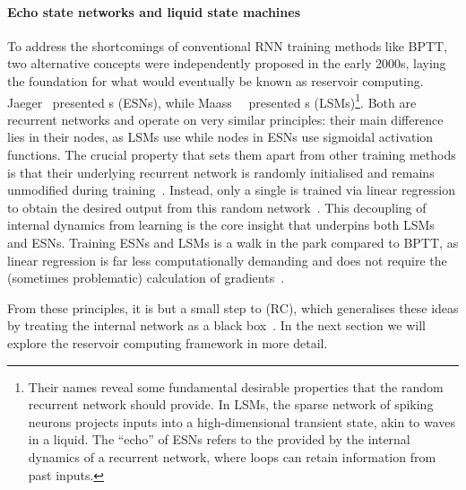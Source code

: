 \paragraph{Echo state networks and liquid state machines}
To address the shortcomings of conventional RNN training methods like BPTT, two alternative concepts were independently proposed in the early 2000s, laying the foundation for what would eventually be known as reservoir computing.
Jaeger~\cite{jaeger2001echo} presented s (ESNs), while Maass~\etal~\cite{maass_LSM} presented s (LSMs)\footnote{
	Their names reveal some fundamental desirable properties that the random recurrent network should provide.
	In LSMs, the sparse network of spiking neurons projects inputs into a high-dimensional transient state, akin to waves in a liquid.
	The ``echo'' of ESNs refers to the  provided by the internal dynamics of a recurrent network, where loops can retain information from past inputs.
}.
Both are recurrent networks and operate on very similar principles: their main difference lies in their nodes, as LSMs use  while nodes in ESNs use sigmoidal activation functions.
The crucial property that sets them apart from other training methods is that their underlying recurrent network is randomly initialised and remains unmodified during training~\cite{ReviewESNs,RC_Tensegrity}.
Instead, only a single  is trained via linear regression to obtain the desired output from this random network~\cite{D-LSM,D-ESN-Improved}.
This decoupling of internal dynamics from learning is the core insight that underpins both LSMs and ESNs.
Training ESNs and LSMs is a walk in the park compared to BPTT, as linear regression is far less computationally demanding and does not require the (sometimes problematic) calculation of gradients~\cite{D-ESN-Improved}. \par
From these principles, it is but a small step to  (RC), which generalises these ideas by treating the internal network as a black box~\cite{RC_unification,D-ESN-Improved,RC_Tensegrity}.
In the next section we will explore the reservoir computing framework in more detail.


